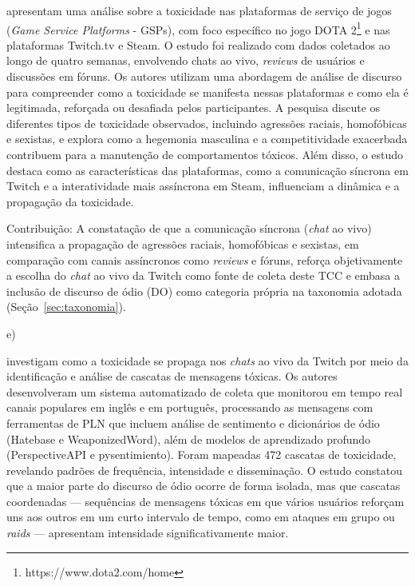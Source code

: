 \documentclass{eic-bcc-tcc}
\begin{document}
\cite{doi:10.1177/13548565211028809} apresentam uma análise sobre a toxicidade nas plataformas de serviço de jogos (\textit{Game Service Platforms} - GSPs), com foco específico no jogo DOTA 2\footnote{https://www.dota2.com/home} e nas plataformas Twitch.tv e Steam. O estudo foi realizado com dados coletados ao longo de quatro semanas, envolvendo chats ao vivo, \textit{reviews} de usuários e discussões em fóruns. Os autores utilizam uma abordagem de análise de discurso para compreender como a toxicidade se manifesta nessas plataformas e como ela é legitimada, reforçada ou desafiada pelos participantes. A pesquisa discute os diferentes tipos de toxicidade observados, incluindo agressões raciais, homofóbicas e sexistas, e explora como a hegemonia masculina e a competitividade exacerbada contribuem para a manutenção de comportamentos tóxicos. Além disso, o estudo destaca como as características das plataformas, como a comunicação síncrona em Twitch e a interatividade mais assíncrona em Steam, influenciam a dinâmica e a propagação da toxicidade.

Contribuição: A constatação de que a comunicação síncrona (\textit{chat} ao vivo) intensifica a propagação de agressões raciais, homofóbicas e sexistas, em comparação com canais assíncronos como \textit{reviews} e fóruns, reforça objetivamente a escolha do \textit{chat} ao vivo da Twitch como fonte de coleta deste TCC e embasa a inclusão de discurso de ódio (DO) como categoria própria na taxonomia adotada (Seção~\ref{sec:taxonomia}).


e) \cite{lobo2025cascatas}

\cite{lobo2025cascatas} investigam como a toxicidade se propaga nos \textit{chats} ao vivo da Twitch por meio da identificação e análise de cascatas de mensagens tóxicas. Os autores desenvolveram um sistema automatizado de coleta que monitorou em tempo real canais populares em inglês e em português, processando as mensagens com ferramentas de PLN que incluem análise de sentimento e dicionários de ódio (Hatebase e WeaponizedWord), além de modelos de aprendizado profundo (PerspectiveAPI e pysentimiento). Foram mapeadas 472 cascatas de toxicidade, revelando padrões de frequência, intensidade e disseminação. O estudo constatou que a maior parte do discurso de ódio ocorre de forma isolada, mas que cascatas coordenadas — sequências de mensagens tóxicas em que vários usuários reforçam uns aos outros em um curto intervalo de tempo, como em ataques em grupo ou \textit{raids} — apresentam intensidade significativamente maior.
\end{document}
